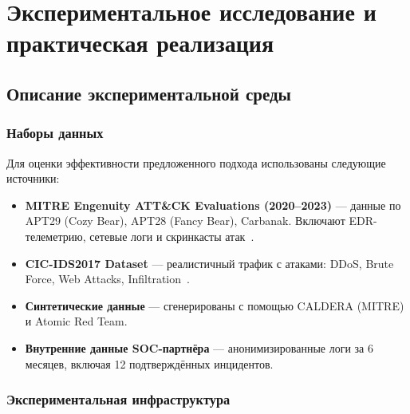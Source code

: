 
\chapter{Экспериментальное исследование и практическая реализация}

\section{Описание экспериментальной среды}

\subsection{Наборы данных}

Для оценки эффективности предложенного подхода использованы следующие источники:
\begin{itemize}
    \item \textbf{MITRE Engenuity ATT\&CK Evaluations (2020–2023)} — данные по APT29 (Cozy Bear), APT28 (Fancy Bear), Carbanak. Включают EDR-телеметрию, сетевые логи и скринкасты атак~\cite{MITRE2023}.
    \item \textbf{CIC-IDS2017 Dataset} — реалистичный трафик с атаками: DDoS, Brute Force, Web Attacks, Infiltration~\cite{CIC2017}.
    \item \textbf{Синтетические данные} — сгенерированы с помощью CALDERA (MITRE) и Atomic Red Team.
    \item \textbf{Внутренние данные SOC-партнёра} — анонимизированные логи за 6 месяцев, включая 12 подтверждённых инцидентов.
\end{itemize}
\subsection{Экспериментальная инфраструктура}

